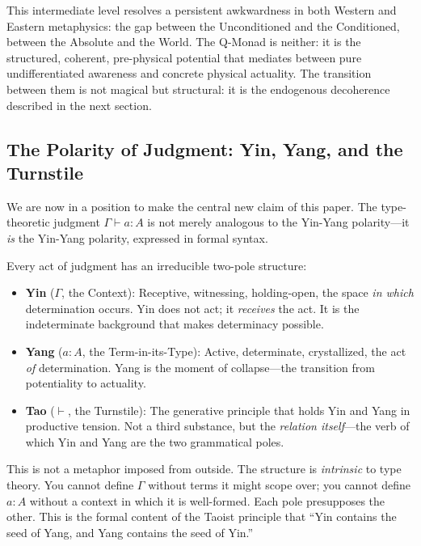 \documentclass[12pt,a4paper]{article}
\newcommand{\turnstile}{\vdash}
\begin{document}
This intermediate level resolves a persistent awkwardness in both Western and Eastern metaphysics: the gap between the Unconditioned and the Conditioned, between the Absolute and the World. The Q-Monad is neither: it is the structured, coherent, pre-physical potential that mediates between pure undifferentiated awareness and concrete physical actuality. The transition between them is not magical but structural: it is the endogenous decoherence described in the next section.


\subsection{The Polarity of Judgment: Yin, Yang, and the Turnstile}
\label{sec:polarity}

We are now in a position to make the central new claim of this paper. The type-theoretic judgment $\Gamma \turnstile a : A$ is not merely analogous to the Yin-Yang polarity---it \emph{is} the Yin-Yang polarity, expressed in formal syntax.

Every act of judgment has an irreducible two-pole structure:

\begin{itemize}[leftmargin=2em]
\item \textbf{Yin} ($\Gamma$, the Context): Receptive, witnessing, holding-open, the space \emph{in which} determination occurs. Yin does not act; it \emph{receives} the act. It is the indeterminate background that makes determinacy possible.

\item \textbf{Yang} ($a : A$, the Term-in-its-Type): Active, determinate, crystallized, the act \emph{of} determination. Yang is the moment of collapse---the transition from potentiality to actuality.

\item \textbf{Tao} ($\turnstile$, the Turnstile): The generative principle that holds Yin and Yang in productive tension. Not a third substance, but the \emph{relation itself}---the verb of which Yin and Yang are the two grammatical poles.
\end{itemize}

This is not a metaphor imposed from outside. The structure is \emph{intrinsic} to type theory. You cannot define $\Gamma$ without terms it might scope over; you cannot define $a : A$ without a context in which it is well-formed. Each pole presupposes the other. This is the formal content of the Taoist principle that ``Yin contains the seed of Yang, and Yang contains the seed of Yin.''
\end{document}
